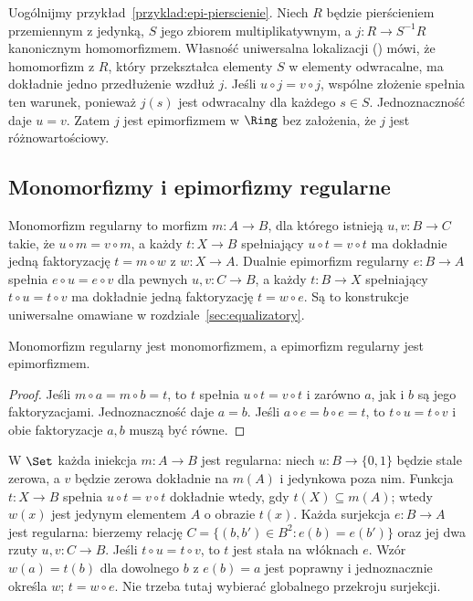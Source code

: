 \begin{przyklad}\label{cat:ex:epi-lokalizacja}
Uogólnijmy przykład~\ref{przyklad:epi-pierscienie}. Niech $R$ będzie pierścieniem przemiennym z jedynką, $S$ jego zbiorem multiplikatywnym, a $j:R\to S^{-1}R$ kanonicznym homomorfizmem. Własność uniwersalna lokalizacji () mówi, że homomorfizm z $R$, który przekształca elementy $S$ w elementy odwracalne, ma dokładnie jedno przedłużenie wzdłuż $j$. Jeśli $u\circ j=v\circ j$, wspólne złożenie spełnia ten warunek, ponieważ $j(s)$ jest odwracalny dla każdego $s\in S$. Jednoznaczność daje $u=v$. Zatem $j$ jest epimorfizmem w $\Ring$ bez założenia, że $j$ jest różnowartościowy.
\end{przyklad}

\subsection{Monomorfizmy i epimorfizmy regularne}

\begin{definicja}\label{cat:def:regularne}
Monomorfizm regularny to morfizm $m:A\to B$, dla którego istnieją $u,v:B\to C$ takie, że $u\circ m=v\circ m$, a każdy $t:X\to B$ spełniający $u\circ t=v\circ t$ ma dokładnie jedną faktoryzację $t=m\circ w$ z $w:X\to A$. Dualnie epimorfizm regularny $e:B\to A$ spełnia $e\circ u=e\circ v$ dla pewnych $u,v:C\to B$, a każdy $t:B\to X$ spełniający $t\circ u=t\circ v$ ma dokładnie jedną faktoryzację $t=w\circ e$. Są to konstrukcje uniwersalne omawiane w rozdziale~\ref{sec:equalizatory}.
\end{definicja}

\begin{stwierdzenie}\label{cat:prop:regularne-mono-epi}
Monomorfizm regularny jest monomorfizmem, a epimorfizm regularny jest epimorfizmem.
\end{stwierdzenie}
\begin{proof}
Jeśli $m\circ a=m\circ b=t$, to $t$ spełnia $u\circ t=v\circ t$ i zarówno $a$, jak i $b$ są jego faktoryzacjami. Jednoznaczność daje $a=b$. Jeśli $a\circ e=b\circ e=t$, to $t\circ u=t\circ v$ i obie faktoryzacje $a,b$ muszą być równe.
\end{proof}

\begin{przyklad}
W $\Set$ każda iniekcja $m:A\to B$ jest regularna: niech $u:B\to\{0,1\}$ będzie stale zerowa, a $v$ będzie zerowa dokładnie na $m(A)$ i jedynkowa poza nim. Funkcja $t:X\to B$ spełnia $u\circ t=v\circ t$ dokładnie wtedy, gdy $t(X)\subseteq m(A)$; wtedy $w(x)$ jest jedynym elementem $A$ o obrazie $t(x)$. Każda surjekcja $e:B\to A$ jest regularna: bierzemy relację $C=\{(b,b')\in B^2:e(b)=e(b')\}$ oraz jej dwa rzuty $u,v:C\to B$. Jeśli $t\circ u=t\circ v$, to $t$ jest stała na włóknach $e$. Wzór $w(a)=t(b)$ dla dowolnego $b$ z $e(b)=a$ jest poprawny i jednoznacznie określa $w$; $t=w\circ e$. Nie trzeba tutaj wybierać globalnego przekroju surjekcji.
\end{przyklad}

